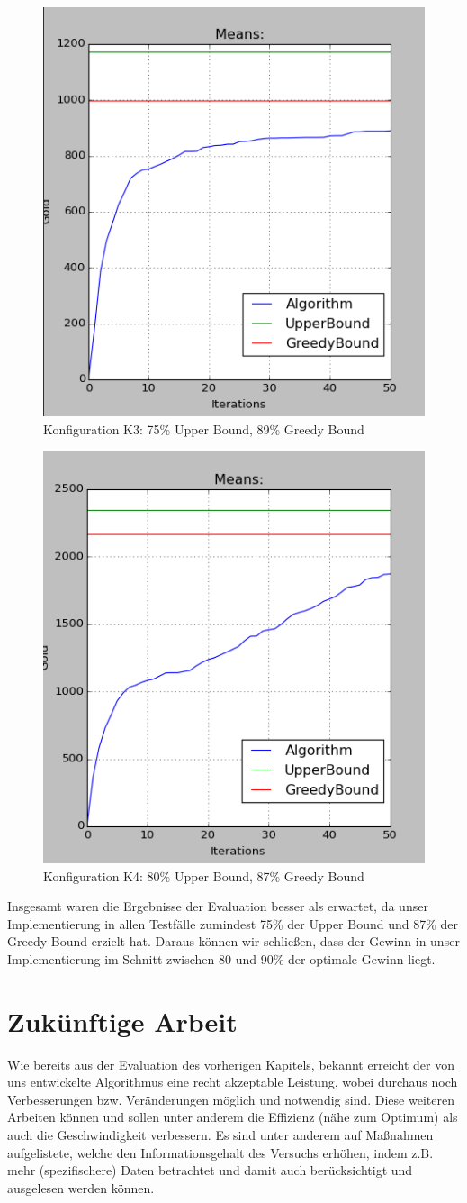 \documentclass[fleqn,10pt]{SelfArx} %
\begin{document}
\label{fig:eval2}
\begin{figure}
  \centering
  \includegraphics[width=.4\textwidth]{10ad_15ag_50r_50it_cut.png}
  \caption{Konfiguration K3: 75\% Upper Bound, 89\% Greedy Bound}
\end{figure}
\label{fig:eval3}
\begin{figure}
  \centering
  \includegraphics[width=.4\textwidth]{20ad_15ag_50r_50it_cut.png}
  \caption{Konfiguration K4: 80\% Upper Bound, 87\% Greedy Bound}
\end{figure}
\label{fig:eval4}
Insgesamt waren die Ergebnisse der Evaluation besser als erwartet, da unser Implementierung in allen Testfälle zumindest 75\% der Upper Bound und 87\% der Greedy Bound erzielt hat. Daraus können wir schließen, dass der Gewinn in unser Implementierung im Schnitt zwischen 80 und 90\% der optimale Gewinn liegt.
\section{Zukünftige Arbeit}
\label{sec:Future}

Wie bereits aus der Evaluation des vorherigen Kapitels, bekannt erreicht der von uns entwickelte Algorithmus eine recht akzeptable Leistung, wobei durchaus noch Verbesserungen bzw. Veränderungen möglich und notwendig sind. Diese weiteren Arbeiten können und sollen unter anderem die Effizienz (nähe zum Optimum) als auch die Geschwindigkeit verbessern. Es sind unter anderem auf Maßnahmen aufgelistete, welche den Informationsgehalt des Versuchs erhöhen, indem z.B. mehr (spezifischere) Daten betrachtet und damit auch berücksichtigt und ausgelesen werden können.
\end{document}
